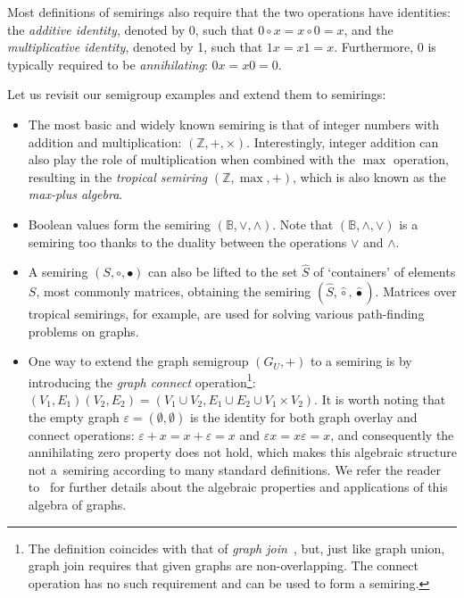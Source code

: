 Most definitions of semirings also require that the two operations have
identities: the \emph{additive identity}, denoted by 0, such that
$0 \circ x = x \circ 0=x$, and the \emph{multiplicative identity}, denoted by 1,
such that $1x=x1=x$. Furthermore, 0 is typically required to be
\emph{annihilating}: $0x=x0=0$.

Let us revisit our semigroup examples and extend them to semirings:

\begin{itemize}
  \item The most basic and widely known semiring is that of integer numbers with
  addition and multiplication: $(\mathbb{Z}, +, \times)$. Interestingly, integer
  addition can also play the role of multiplication when combined with the
  $\max$ operation, resulting in the \emph{tropical semiring}
  $(\mathbb{Z}, \max, +)$, which is also known as the \emph{max-plus algebra}.

  \item Boolean values form the semiring $(\mathbb{B}, \vee, \wedge)$. Note that
  $(\mathbb{B}, \wedge, \vee)$ is a semiring too thanks to the duality between
  the operations $\vee$ and $\wedge$.

  \item A semiring $(S, \circ, \bullet)$ can also be lifted to the set $\hat{S}$
  of `containers' of elements $S$, most commonly matrices, obtaining the semiring
  $(\hat{S}, \hat{\circ}, \hat{\bullet})$. Matrices over tropical semirings, for
  example, are used for solving various path-finding problems on graphs.

  \item One way to extend the graph semigroup $(G_U,+)$ to a semiring is by
  introducing the \emph{graph connect} operation\footnote{The definition
  coincides with that of \emph{graph join}~\cite{1969_graph_theory_harary}, but,
  just like graph union, graph join requires that given graphs are
  non-overlapping. The connect operation has no such requirement and can be used
  to form a semiring.}:
  $(V_1, E_1) (V_2, E_2) = (V_1 \cup V_2, E_1 \cup E_2 \cup V_1 \times V_2)$.
  It is worth noting that the empty graph $\varepsilon = (\emptyset, \emptyset)$
  is the identity for both graph overlay and connect operations:
  $\varepsilon + x = x + \varepsilon = x$ and $\varepsilon x = x \varepsilon = x$,
  and consequently the annihilating zero property does not hold, which makes
  this algebraic structure not a~semiring according to many standard definitions.
  We refer the reader to~\cite{mokhov2017algebraic} for further details about the
  algebraic properties and applications of this algebra of graphs.
\end{itemize}

